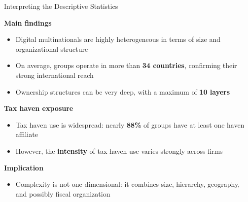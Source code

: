 \documentclass[11pt,aspectratio=169]{beamer}
\begin{document}
  \begin{frame}{Interpreting the Descriptive Statistics}
  
  \textbf{Main findings}
  
  \begin{itemize}
      \item Digital multinationals are highly heterogeneous in terms of size and organizational structure
      \item On average, groups operate in more than \textbf{34 countries}, confirming their strong international reach
      \item Ownership structures can be very deep, with a maximum of \textbf{10 layers}
  \end{itemize}
  
  \textbf{Tax haven exposure}
  
  \begin{itemize}
      \item Tax haven use is widespread: nearly \textbf{88\%} of groups have at least one haven affiliate
      \item However, the \textbf{intensity} of tax haven use varies strongly across firms
  \end{itemize}
  
  \textbf{Implication}
  
  \begin{itemize}
      \item Complexity is not one-dimensional: it combines size, hierarchy, geography, and possibly fiscal organization
  \end{itemize}
  
  \end{frame}
  
\end{document}

